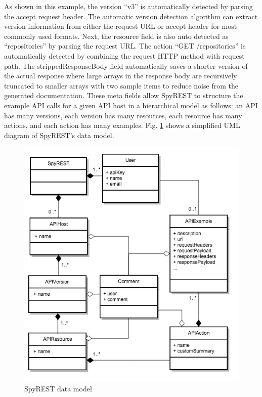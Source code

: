 \documentclass[conference]{IEEEtran}
\begin{document}
As shown in this example, the version ``v3'' is automatically detected by parsing the accept request header. The automatic version detection algorithm can extract version information from either the request URL or accept header for most commonly used formats. Next, the resource field is also auto detected as ``repositories'' by parsing the request URL. The action ``GET /repositories'' is automatically detected by combining the request HTTP method with request path. The strippedResponseBody field automatically saves a shorter version of the actual response where large arrays in the response body are recursively truncated to smaller arrays with two sample items to reduce noise from the generated documentation. These meta fields allow SpyREST to structure the example API calls for a given API host in a hierarchical model as follows: an API has many versions, each version has many resources, each resource has many actions, and each action has many examples. Fig. \ref{fig:data_model} shows a simplified UML diagram of SpyREST's data model.

\begin{figure}[!tbh]
  \centering
  \includegraphics[width=\linewidth]{data_model.png}
  \caption{SpyREST data model}
  \label{fig:data_model}
\end{figure}
\end{document}

